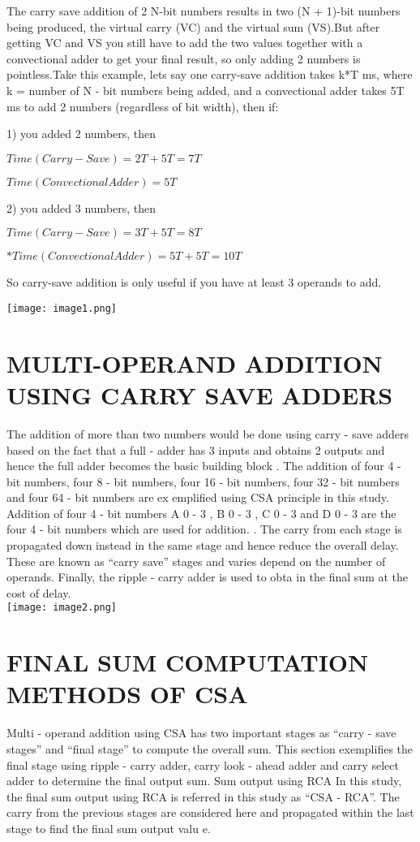 \documentclass[11pt, twoside]{article}
\begin{document}
The carry save addition of 2 N-bit numbers results in two (N + 1)-bit numbers being produced, the virtual carry (VC) and the virtual sum (VS).But after getting VC and VS you still have to add the two values together with a convectional adder to get your final result, so only adding 2 numbers is pointless.Take this example, lets say one carry-save addition takes k*T ms, where k = number of N - bit numbers being added, and a convectional adder takes 5T ms to add 2 numbers (regardless of bit width), then if:

1) you added 2 numbers, then

$Time(Carry-Save) = 2T + 5T = 7T$

$Time(Convectional Adder) = 5T$

2) you added 3 numbers, then

$Time(Carry-Save) = 3T + 5T = 8T$

$*Time(Convectional Adder) = 5T + 5T = 10T$

So carry-save addition is only useful if you have at least 3 operands to add.

\texttt{[image: image1.png]}

\section{MULTI-OPERAND ADDITION USING CARRY SAVE ADDERS}


The  addition  of  more  than  two numbers would  be  done using carry
-
save adders  based  on 
the  fact  that a 
full
-
adder has 3 inputs and obtains 2 outputs and hence the full adder becomes the basic building block .  The  addition  of  four  4
-
bit  numbers,  four  8
-
bit  numbers,  four  16
-
bit  numbers,  four  32
-
bit  numbers 
and four 64
-
bit numbers are ex
emplified using CSA principle in this study.
Addition of four 4
-
bit numbers
A
0
-
3
,  B
0
-
3
,  C
0
-
3
and  D
0
-
3
are  the  four  4
-
bit  numbers  which  are  used  for  addition.
.  The  carry  from  each 
stage is propagated down instead in the same stage and hence reduce the overall delay. These are known 
as “carry save” stages and varies depend on the number of operands. Finally, the ripple
-
carry  adder  is 
used  to  obta
in  the  final  sum  at  the  cost  of  delay.\\

\texttt{[image: image2.png]}

\section{FINAL SUM COMPUTATION METHODS OF CSA}
Multi
-
operand addition using CSA has two important stages as “carry
-
save stages” and “final stage” to 
compute the overall sum. This section exemplifies the final stage using ripple
-
carry adder, carry look
-
ahead 
adder and carry select adder to determine
the final output sum.
Sum output using RCA 
In this study, the final sum output using RCA is referred in this study as “CSA
-
RCA”. The carry from the 
previous  stages  are  considered  here  and  propagated  within  the  last  stage  to  find  the  final  sum  output 
valu
e. 
\end{document}
